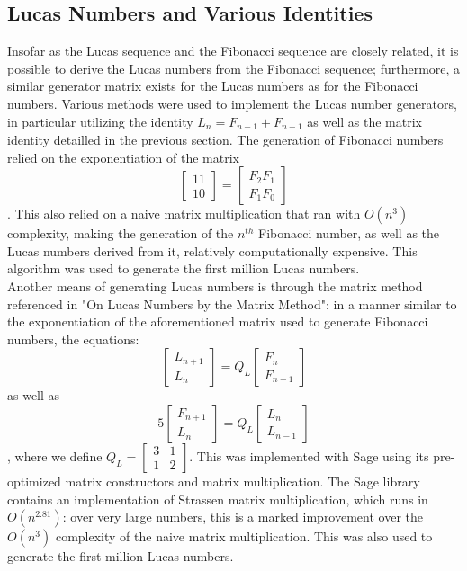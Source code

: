 \documentclass[11pt]{article}
\begin{document}
\subsection{Lucas Numbers and Various Identities}

Insofar as the Lucas sequence and the Fibonacci sequence are closely related, it is possible to derive the Lucas numbers from the Fibonacci sequence; furthermore, a similar generator matrix exists for the Lucas numbers as for the Fibonacci numbers. Various methods were used to implement the Lucas number generators, in particular utilizing the identity $L_{n} = F_{n-1} + F_{n+1}$ as well as the matrix identity detailled in the previous section. The generation of Fibonacci numbers relied on the exponentiation of the matrix \[
\begin{bmatrix}
1 1\\
1 0
\end{bmatrix} =  \begin{bmatrix} 
	F_{2} F_{1} \\
	F_{1} F_{0}
	
\end{bmatrix}
\] . This also relied on a naive matrix multiplication that ran with $O(n^{3})$ complexity, making the generation of the $n^{th}$ Fibonacci number, as well as the Lucas numbers derived from it, relatively  computationally expensive. This algorithm was used to generate the first million Lucas numbers.\\
Another means of generating Lucas numbers is through the matrix method referenced in "On Lucas Numbers by the Matrix Method": in a manner similar to the exponentiation of the aforementioned matrix used to generate Fibonacci numbers, the equations:
\[
\begin{bmatrix}
L_{n+1} \\
L_{n}
\end{bmatrix} = Q_{L} \begin{bmatrix} F_{n} \\ F_{n-1}\end{bmatrix}
\] 
as well as \\
\[
5\begin{bmatrix}
F_{n+1} \\
L_{n}
\end{bmatrix} = Q_{L} \begin{bmatrix} L_{n} \\ L_{n-1}\end{bmatrix}
\] , where we define $Q_{L} = \begin{bmatrix} 3 & 1 \\ 1 & 2 \end{bmatrix}$. This was implemented with Sage using its pre-optimized matrix constructors and matrix multiplication. The Sage library contains an implementation of Strassen matrix multiplication, which runs in $O(n^{2.81})$: over very large numbers, this is a marked improvement over the $O(n^{3})$ complexity of the naive matrix multiplication. This was also used to generate the first million Lucas numbers.
\end{document}
